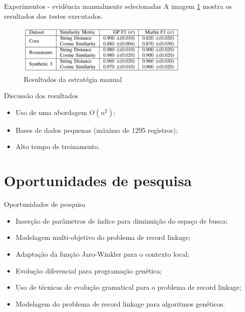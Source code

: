 \documentclass{beamer}
\newcommand\Fontvi{\fontsize{7}{7.2}\selectfont}
\begin{document}
  \begin{frame}{Experimentos - evidência manualmente selecionadas}
      A imagem \ref{fig:tbl1} mostra os resultados dos testes executados.
      \begin{figure}
          \centering
          \includegraphics[width=0.75\textwidth]{resultados-manuais.png}
          \caption{Resultados da estratégia manual \cite{geneticrl}}
          \label{fig:tbl1}
      \end{figure}
  \end{frame}

  \begin{frame}{Discussão dos resultados}
      \begin{itemize}
          \item Uso de uma abordagem $O(n^2)$;
          \item Bases de dados pequenas (máximo de 1295 registros);
          \item Alto tempo de treinamento.
      \end{itemize}
  \end{frame}

  \section{Oportunidades de pesquisa}
  \begin{frame}{Oportunidades de pesquisa}
      \Fontvi
      \begin{itemize}
          \item Inserção de parâmetros de índice para diminuição do espaço de busca;
          \item Modelagem multi-objetivo do problema de record linkage;
          \item Adaptação da função Jaro-Winkler para o contexto local;
          \item Evolução diferencial para programação genética;
          \item Uso de técnicas de evolução gramatical \cite{grammatical-evolution} para o problema de record linkage;
          \item Modelagem do problema de record linkage para algoritmos genéticos.
      \end{itemize}
  \end{frame}
\end{document}
